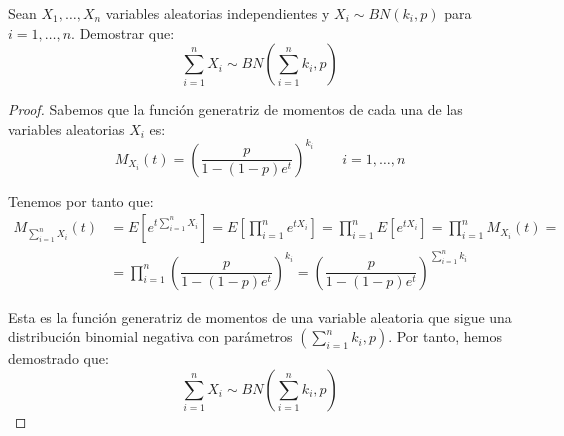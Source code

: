 \begin{ejercicio}
    Sean $X_1, \dots, X_n$ variables aleatorias independientes y $X_i\sim BN(k_i, p)$ para $i=1,\dots,n$. Demostrar que:
    \begin{equation*}
        \sum_{i=1}^{n}X_i \sim BN\left(\sum_{i=1}^{n}k_i, p\right)
    \end{equation*}
    \begin{proof}
        Sabemos que la función generatriz de momentos de cada una de las variables aleatorias $X_i$ es:
        \begin{equation*}
            M_{X_i}(t) = \left(\dfrac{p}{1-(1-p)e^t}\right)^{k_i} \qquad i=1,\dots,n
        \end{equation*}

        Tenemos por tanto que:
        \begin{align*}
            M_{\sum\limits_{i=1}^{n}X_i}(t) &= E\left[e^{t\sum\limits_{i=1}^{n}X_i}\right] = E\left[\prod_{i=1}^{n}e^{tX_i}\right] = \prod_{i=1}^{n}E[e^{tX_i}] = \prod_{i=1}^{n}M_{X_i}(t) =\\
            &= \prod_{i=1}^{n}\left(\dfrac{p}{1-(1-p)e^t}\right)^{k_i} = \left(\dfrac{p}{1-(1-p)e^t}\right)^{\sum\limits_{i=1}^{n}k_i}
        \end{align*}

        Esta es la función generatriz de momentos de una variable aleatoria que sigue una distribución binomial negativa con parámetros $\left(\sum\limits_{i=1}^{n}k_i, p\right)$. Por tanto, hemos demostrado que:
        \begin{equation*}
            \sum_{i=1}^{n}X_i \sim BN\left(\sum_{i=1}^{n}k_i, p\right)
        \end{equation*}
    \end{proof}
\end{ejercicio}